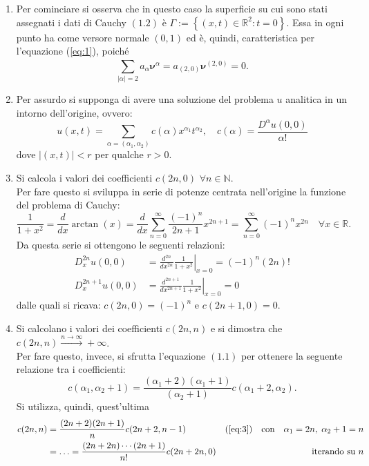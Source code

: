 \begin{example}
\begin{enumerate}
\item
Per cominciare si osserva che in questo caso la superficie su cui sono stati assegnati i dati di Cauchy $(1.2)$ è $\Gamma:=\left\lbrace(x,t) \in \mathbb{R}^2:t=0\right\rbrace$. Essa in ogni punto ha come versore normale $(0,1)$ ed è, quindi, caratteristica per l'equazione (\ref{eq:1}), poiché
$$\sum_{|\alpha|=2}^{\;} a_\alpha \boldsymbol{\nu}^\alpha = a_{(2,0)}\boldsymbol{\nu}^{(2,0)} = 0.$$
\item
Per assurdo si supponga di avere una soluzione del problema $u$ analitica in un intorno dell'origine, ovvero:
$$u(x,t) = \sum_{\alpha = (\alpha_1, \alpha_2) }^{\;} c(\alpha) x^{\alpha_1} t ^{\alpha_2}, \quad
 c(\alpha) = \frac{D^\alpha u(0,0)}{\alpha!}$$
dove $|(x,t)|<r$ per qualche $r>0$.
\item
Si calcola i valori dei coefficienti $c(2n,0)$ $\forall n \in \mathbb{N}$.\\
Per fare questo si sviluppa in serie di potenze centrata nell'origine la funzione del problema di Cauchy:
$$\frac{1}{1+x^2} = \frac{d}{dx}\arctan(x) = \frac{d}{dx}\sum_{n=0}^{\infty}\frac{(-1)^n}{2n+1}x^{2n+1} 
= \sum_{n=0}^{\infty}(-1)^n x^{2n} \quad \forall x \in \mathbb{R}.$$
Da questa serie si ottengono le seguenti relazioni:
\begin{align*}
D_x^{2n}u(0,0) &= \frac{d^{2n}}{dx^{2n}} \left. \frac{1}{1+x^2}\right|_{x=0} = (-1)^n (2n)!\\
D_x^{2n+1}u(0,0) &= \frac{d^{2n+1}}{dx^{2n+1}} \left. \frac{1}{1+x^2} \right|_{x=0} = 0
\end{align*} 
dalle quali si ricava: $c(2n,0)=(-1)^n$ e $c(2n+1,0)=0$.
\item
Si calcolano i valori dei coefficienti $c(2n,n)$ e si dimostra che  $c(2n,n) \xrightarrow{n\rightarrow\infty} +\infty$.\\
Per fare questo, invece, si sfrutta l'equazione $(1.1)$ per ottenere la seguente relazione tra i coefficienti:
\begin{equation} 
\label{eq:3}
c(\alpha_1,\alpha_2+1) = \frac{(\alpha_1+2)(\alpha_1+1)}{(\alpha_2+1)}c(\alpha_1+2,\alpha_2).
\end{equation}
Si utilizza, quindi, quest'ultima 
\begin{align*}
c(2n,n) &= \frac{(2n+2)(2n+1)}{n}c(2n+2,n-1)   &(\ref{eq:3})\quad\text{con}\quad\alpha_1=2n,\; \alpha_2+1=n\\
 &= \ldots = \frac{(2n+2n)\cdots(2n+1)}{n!}c(2n+2n,0) &\text{\quad iterando su } n\\

\end{align*}
\end{enumerate}
\end{example}
